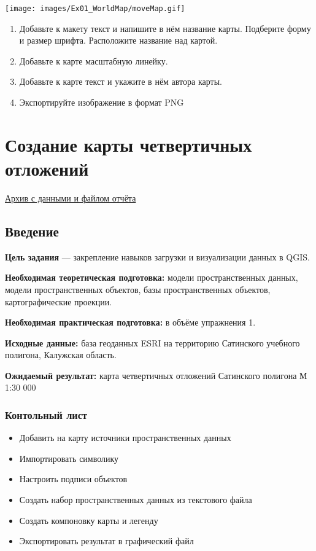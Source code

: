 \documentclass[
  12pt,
]{book}
\providecommand{\tightlist}{%
  \setlength{\itemsep}{0pt}\setlength{\parskip}{0pt}}
\begin{document}
\texttt{[image: images/Ex01\_WorldMap/moveMap.gif]}

\begin{enumerate}
\def\labelenumi{\arabic{enumi}.}
\setcounter{enumi}{9}
\item
  Добавьте к макету текст и напишите в нём название карты. Подберите форму и размер шрифта. Расположите название над картой.
\item
  Добавьте к карте масштабную линейку.
\item
  Добавьте к карте текст и укажите в нём автора карты.
\item
  Экспортируйте изображение в формат PNG
\end{enumerate}

\hypertarget{map-design-quaternary}{%
\chapter{Создание карты четвертичных отложений}\label{map-design-quaternary}}

\href{https://1drv.ms/u/s!AmtmZDq3JgxHgZUFCgDwGfEvocDIrw?e=LZbP6h}{Архив с данными и файлом отчёта}

\hypertarget{map-design-quaternary-intro}{%
\section{Введение}\label{map-design-quaternary-intro}}

\textbf{Цель задания} --- закрепление навыков загрузки и визуализации данных в QGIS.

\textbf{Необходимая теоретическая подготовка:} модели пространственных данных, модели пространственных объектов, базы пространственных объектов, картографические проекции.

\textbf{Необходимая практическая подготовка:} в объёме упражнения 1.

\textbf{Исходные данные:} база геоданных ESRI на территорию Сатинского учебного полигона, Калужская область.

\textbf{Ожидаемый результат:} карта четвертичных отложений Сатинского полигона М 1:30 000

\hypertarget{map-design-quaternary-checklist}{%
\subsection{Контольный лист}\label{map-design-quaternary-checklist}}

\begin{itemize}
\tightlist
\item
  Добавить на карту источники пространственных данных
\item
  Импортировать символику
\item
  Настроить подписи объектов
\item
  Создать набор пространственных данных из текстового файла
\item
  Создать компоновку карты и легенду
\item
  Экспортировать результат в графический файл
\end{itemize}
\end{document}
